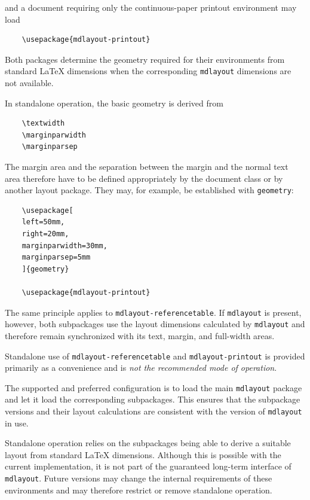 \documentclass[
11pt,
a4paper,
oneside
]{scrbook}
\begin{document}
{and a document requiring only the continuous-paper printout environment may
load

\begin{verbatim}
	\usepackage{mdlayout-printout}
\end{verbatim}

Both packages determine the geometry required for their environments from
standard \LaTeX{} dimensions when the corresponding \texttt{mdlayout}
dimensions are not available.

In standalone operation, the basic geometry is derived from

\begin{verbatim}
	\textwidth
	\marginparwidth
	\marginparsep
\end{verbatim}

The margin area and the separation between the margin and the normal text area
therefore have to be defined appropriately by the document class or by another
layout package. They may, for example, be established with \texttt{geometry}:

\begin{verbatim}
	\usepackage[
	left=50mm,
	right=20mm,
	marginparwidth=30mm,
	marginparsep=5mm
	]{geometry}
	
	\usepackage{mdlayout-printout}
\end{verbatim}

The same principle applies to \texttt{mdlayout-referencetable}. If
\texttt{mdlayout} is present, however, both subpackages use the layout
dimensions calculated by \texttt{mdlayout} and therefore remain synchronized
with its text, margin, and full-width areas.

\begin{note}
	Standalone use of \texttt{mdlayout-referencetable} and
	\texttt{mdlayout-printout} is provided primarily as a convenience and is
	\emph{not the recommended mode of operation}.
	
	The supported and preferred configuration is to load the main
	\texttt{mdlayout} package and let it load the corresponding subpackages.
	This ensures that the subpackage versions and their layout calculations are
	consistent with the version of \texttt{mdlayout} in use.
	
	Standalone operation relies on the subpackages being able to derive a
	suitable layout from standard \LaTeX{} dimensions. Although this is possible
	with the current implementation, it is not part of the guaranteed long-term
	interface of \texttt{mdlayout}. Future versions may change the internal
	requirements of these environments and may therefore restrict or remove
	standalone operation.
\end{note}

}
\end{document}
